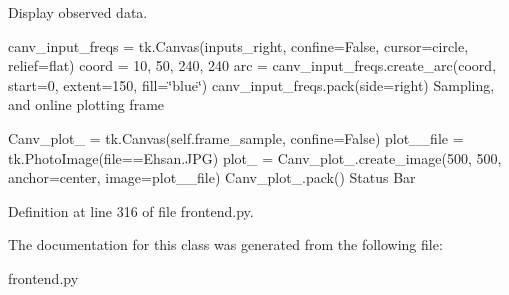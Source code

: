 Display observed data. 

canv\+\_\+input\+\_\+freqs = tk.\+Canvas(inputs\+\_\+right, confine=False, cursor=\textquotesingle{}circle\textquotesingle{}, relief=\textquotesingle{}flat\textquotesingle{}) coord = 10, 50, 240, 240 arc = canv\+\_\+input\+\_\+freqs.\+create\+\_\+arc(coord, start=0, extent=150, fill=\char`\"{}blue\char`\"{}) canv\+\_\+input\+\_\+freqs.\+pack(side=\textquotesingle{}right\textquotesingle{}) Sampling, and online plotting frame

Canv\+\_\+plot\+\_ = tk.\+Canvas(self.\+frame\+\_\+sample, confine=False) plot\+\_\+\_\+file = tk.\+Photo\+Image(file==\textquotesingle{}Ehsan.\+J\+PG\textquotesingle{}) plot\+\_ = Canv\+\_\+plot\+\_.\+create\+\_\+image(500, 500, anchor=\textquotesingle{}center\textquotesingle{}, image=plot\+\_\+\_\+file) Canv\+\_\+plot\+\_.\+pack() Status Bar 

Definition at line 316 of file frontend.\+py.



The documentation for this class was generated from the following file\+:\begin{DoxyCompactItemize}
\item 
frontend.\+py\end{DoxyCompactItemize}
